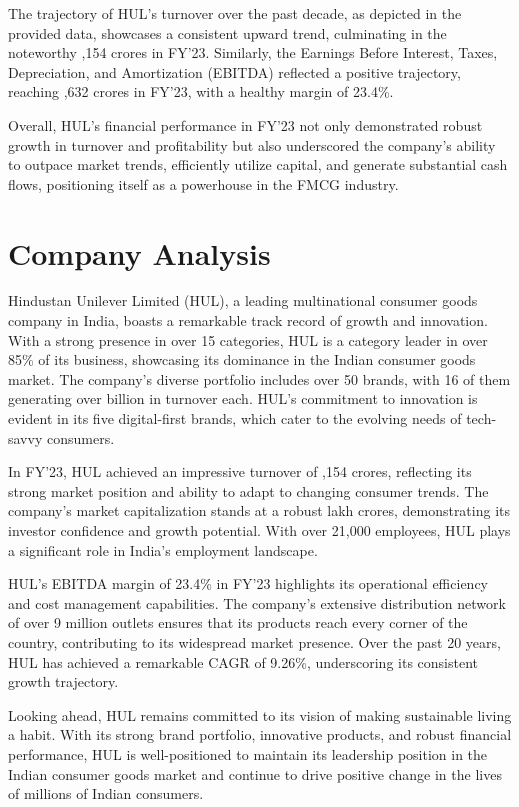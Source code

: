 The trajectory of HUL's turnover over the past decade, as depicted in the provided data, showcases a consistent upward trend, culminating in the noteworthy ,154 crores in FY'23. Similarly, the Earnings Before Interest, Taxes, Depreciation, and Amortization (EBITDA) reflected a positive trajectory, reaching ,632 crores in FY'23, with a healthy margin of 23.4\%.

Overall, HUL's financial performance in FY'23 not only demonstrated robust growth in turnover and profitability but also underscored the company's ability to outpace market trends, efficiently utilize capital, and generate substantial cash flows, positioning itself as a powerhouse in the FMCG industry.


\section{Company Analysis}

Hindustan Unilever Limited (HUL), a leading multinational consumer goods company in India, boasts a remarkable track record of growth and innovation. With a strong presence in over 15 categories, HUL is a category leader in over 85\% of its business, showcasing its dominance in the Indian consumer goods market. The company's diverse portfolio includes over 50 brands, with 16 of them generating over  billion in turnover each. HUL's commitment to innovation is evident in its five digital-first brands, which cater to the evolving needs of tech-savvy consumers.

In FY'23, HUL achieved an impressive turnover of ,154 crores, reflecting its strong market position and ability to adapt to changing consumer trends. The company's market capitalization stands at a robust  lakh crores, demonstrating its investor confidence and growth potential. With over 21,000 employees, HUL plays a significant role in India's employment landscape.

HUL's EBITDA margin of 23.4\% in FY'23 highlights its operational efficiency and cost management capabilities. The company's extensive distribution network of over 9 million outlets ensures that its products reach every corner of the country, contributing to its widespread market presence. Over the past 20 years, HUL has achieved a remarkable CAGR of 9.26\%, underscoring its consistent growth trajectory.

Looking ahead, HUL remains committed to its vision of making sustainable living a habit. With its strong brand portfolio, innovative products, and robust financial performance, HUL is well-positioned to maintain its leadership position in the Indian consumer goods market and continue to drive positive change in the lives of millions of Indian consumers.

